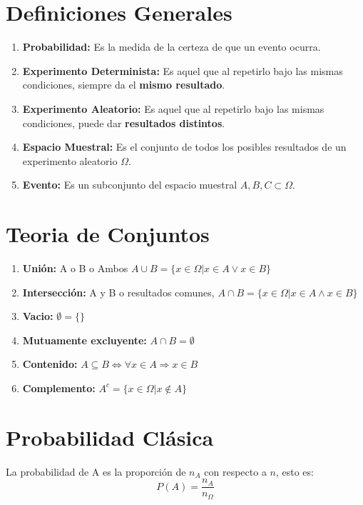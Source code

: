 \documentclass{templateNote}
\begin{document}
\portada
\margenes %


\section{Definiciones Generales}
\begin{enumerate}
    \item \textbf{Probabilidad:} Es la medida de la certeza de que un evento ocurra.
    \item \textbf{Experimento Determinista:} Es aquel que al repetirlo bajo las mismas condiciones, siempre da el \textbf{mismo resultado}.
    \item \textbf{Experimento Aleatorio:} Es aquel que al repetirlo bajo las mismas condiciones, puede dar \textbf{resultados distintos}.
    \item \textbf{Espacio Muestral:} Es el conjunto de todos los posibles resultados de un experimento aleatorio $\Omega$.
    \item \textbf{Evento:} Es un subconjunto del espacio muestral $A, B, C \subset \Omega$.
\end{enumerate}

\section{Teoria de Conjuntos}
\begin{enumerate}
    \item \textbf{Unión:} A o B o Ambos $A \cup B = \{x \in \Omega | x \in A \lor x \in B\}$
    \item \textbf{Intersección:} A y B o resultados comunes, $A \cap B = \{x \in \Omega | x \in A \land x \in B\}$
    \item \textbf{Vacio:} $\emptyset = \{\}$
    \item \textbf{Mutuamente excluyente:} $A \cap B = \emptyset$
    \item \textbf{Contenido:} $A \subseteq B \Leftrightarrow \forall x \in A \Rightarrow x \in B$
    \item \textbf{Complemento:} $A^c = \{x \in \Omega | x \notin A\}$
\end{enumerate}

\section{Probabilidad Clásica}
\indent
La probabilidad de A es la proporción de $n_A$ con respecto a $n$, esto es:
\begin{equation*}
    P(A) = \frac{n_A}{n_{\Omega}}
\end{equation*}
\end{document}
